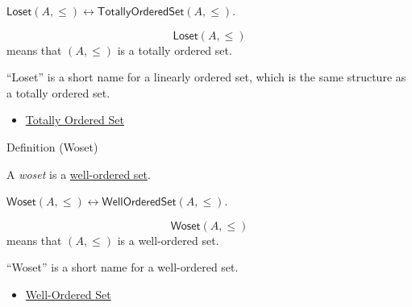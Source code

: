 \begin{remark*}
$\mathsf{Loset}(A,\leq)\leftrightarrow
\mathsf{TotallyOrderedSet}(A,\leq)$.
\end{remark*}

\begin{remark*}
\[
  \mathsf{Loset}(A,\leq)
\] means that $(A,\leq)$ is a totally ordered set.
\end{remark*}

\begin{remark*}[Interpretation]
``Loset'' is a short name for a linearly ordered set, which is the same
structure as a totally ordered set.
\end{remark*}

\begin{dependencies}
\begin{itemize}
  \item \hyperref[def:totally-ordered-set]{Totally Ordered Set}
\end{itemize}
\end{dependencies}

\begin{definitionbox}{Definition (Woset)}
\begin{definition}[Woset]\label{def:woset}
A \emph{woset} is a \hyperref[def:well-ordered-set]{well-ordered set}.
\end{definition}
\end{definitionbox}

\begin{remark*}
$\mathsf{Woset}(A,\leq)\leftrightarrow
\mathsf{WellOrderedSet}(A,\leq)$.
\end{remark*}

\begin{remark*}
\[
  \mathsf{Woset}(A,\leq)
\] means that $(A,\leq)$ is a well-ordered set.
\end{remark*}

\begin{remark*}[Interpretation]
``Woset'' is a short name for a well-ordered set.
\end{remark*}

\begin{dependencies}
\begin{itemize}
  \item \hyperref[def:well-ordered-set]{Well-Ordered Set}
\end{itemize}
\end{dependencies}

